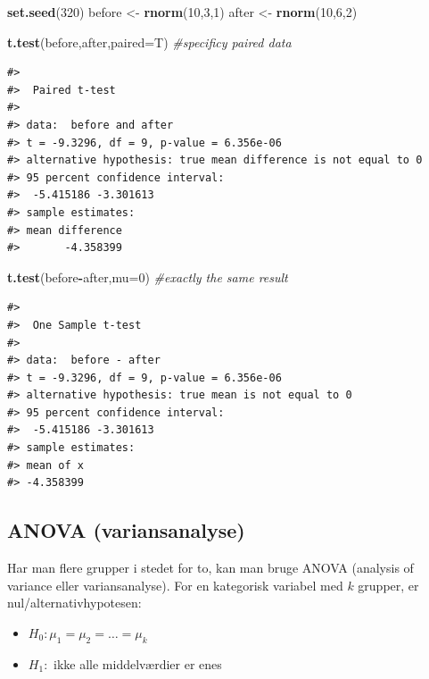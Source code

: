 \documentclass[
]{book}
\newenvironment{Shaded}{\begin{snugshade}}{\end{snugshade}}
\newcommand{\AttributeTok}[1]{\textcolor[rgb]{0.27,0.27,0.27}{#1}}
\newcommand{\CommentTok}[1]{\textcolor[rgb]{0.37,0.37,0.37}{\textit{#1}}}
\newcommand{\DecValTok}[1]{\textcolor[rgb]{0.06,0.06,0.06}{#1}}
\newcommand{\FunctionTok}[1]{\textcolor[rgb]{0.27,0.27,0.27}{\textbf{#1}}}
\newcommand{\NormalTok}[1]{#1}
\newcommand{\OtherTok}[1]{\textcolor[rgb]{0.37,0.37,0.37}{#1}}
\newcommand{\SpecialCharTok}[1]{\textcolor[rgb]{0.43,0.43,0.43}{\textbf{#1}}}
\providecommand{\tightlist}{%
  \setlength{\itemsep}{0pt}\setlength{\parskip}{0pt}}
\begin{document}
\begin{Shaded}
\begin{Highlighting}[]
\FunctionTok{set.seed}\NormalTok{(}\DecValTok{320}\NormalTok{)}
\NormalTok{before }\OtherTok{\textless{}{-}} \FunctionTok{rnorm}\NormalTok{(}\DecValTok{10}\NormalTok{,}\DecValTok{3}\NormalTok{,}\DecValTok{1}\NormalTok{)}
\NormalTok{after }\OtherTok{\textless{}{-}} \FunctionTok{rnorm}\NormalTok{(}\DecValTok{10}\NormalTok{,}\DecValTok{6}\NormalTok{,}\DecValTok{2}\NormalTok{)}

\FunctionTok{t.test}\NormalTok{(before,after,}\AttributeTok{paired=}\NormalTok{T) }\CommentTok{\#specificy paired data}
\end{Highlighting}
\end{Shaded}

\begin{verbatim}
#> 
#>  Paired t-test
#> 
#> data:  before and after
#> t = -9.3296, df = 9, p-value = 6.356e-06
#> alternative hypothesis: true mean difference is not equal to 0
#> 95 percent confidence interval:
#>  -5.415186 -3.301613
#> sample estimates:
#> mean difference 
#>       -4.358399
\end{verbatim}

\begin{Shaded}
\begin{Highlighting}[]
\FunctionTok{t.test}\NormalTok{(before}\SpecialCharTok{{-}}\NormalTok{after,}\AttributeTok{mu=}\DecValTok{0}\NormalTok{) }\CommentTok{\#exactly the same result}
\end{Highlighting}
\end{Shaded}

\begin{verbatim}
#> 
#>  One Sample t-test
#> 
#> data:  before - after
#> t = -9.3296, df = 9, p-value = 6.356e-06
#> alternative hypothesis: true mean is not equal to 0
#> 95 percent confidence interval:
#>  -5.415186 -3.301613
#> sample estimates:
#> mean of x 
#> -4.358399
\end{verbatim}

\subsection{ANOVA (variansanalyse)}\label{anova-variansanalyse}

Har man flere grupper i stedet for to, kan man bruge ANOVA (analysis of variance eller variansanalyse). For en kategorisk variabel med \(k\) grupper, er nul/alternativhypotesen:

\begin{itemize}
\tightlist
\item
  \(H_{0}: \mu_{1} = \mu_{2} = \ldots = \mu_{k}\)
\item
  \(H_{1}:\) ikke alle middelværdier er enes
\end{itemize}
\end{document}
